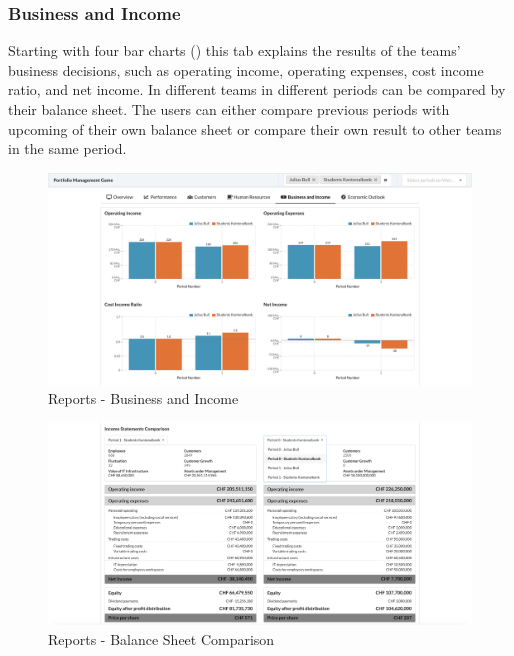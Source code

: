 \subsubsection{Business and Income}
Starting with four bar charts () this tab explains the results of the teams' business decisions, such as operating income, operating expenses, cost income ratio, and net income. In  different teams in different periods can be compared by their balance sheet. The users can either compare previous periods with upcoming of their own balance sheet or compare their own result to other teams in the same period.
\begin{figure}[h!]
  \centering
  \includegraphics[scale=0.2]{img/application-overview/reports/05_business_income.png}
  \caption{Reports - Business and Income}
  \label{fig:reports_business_income}
\end{figure}
\begin{figure}[h!]
  \centering
  \includegraphics[scale=0.2]{img/application-overview/reports/05_business_income_balance_sheet_comparison.png}
  \caption{Reports - Balance Sheet Comparison}
  \label{fig:reports_balance_sheet_comparison}
\end{figure}


